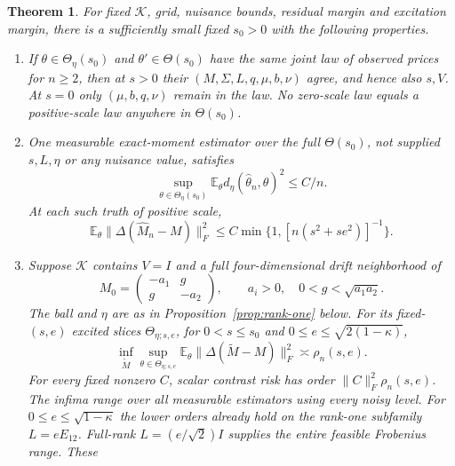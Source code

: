 \documentclass[11pt,a4paper]{amsart}
\theoremstyle{plain}
\newtheorem{theorem}{Theorem}[section]
\theoremstyle{definition}
\theoremstyle{remark}
\newcommand{\EE}{\mathbb{E}}
\begin{document}
\begin{theorem}\label{thm:main}
For fixed $\mathcal K$, grid, nuisance bounds, residual margin and
excitation margin, there is a sufficiently small fixed $s_0>0$ with the
following properties.
\begin{enumerate}[label=\textup{(\Alph*)},leftmargin=*]
\item\label{part:id} If $\theta\in\Theta_\eta(s_0)$ and
$\theta'\in\Theta(s_0)$ have the same joint law of observed prices for
$n\ge2$, then at $s>0$ their $(M,\Sigma,L,q,\mu,b,\nu)$ agree, and hence
also $s,V$. At $s=0$ only $(\mu,b,q,\nu)$ remain in the law. No zero-scale
law equals a positive-scale law anywhere in $\Theta(s_0)$.
\item\label{part:upper} One measurable exact-moment estimator over the
full $\Theta(s_0)$, not supplied $s,L,\eta$ or any nuisance value,
satisfies
\begin{equation}\label{eq:joint-risk}
 \sup_{\theta\in\Theta_\eta(s_0)}
 \EE_\theta d_\eta(\widehat\theta_n,\theta)^2\le C/n.
\end{equation}
At each such truth of positive scale,
\begin{equation}\label{eq:drift-upper}
 \EE_\theta\|\Delta(\widehat M_n-M)\|_F^2
 \le C\min\{1,[n(s^2+se^2)]^{-1}\}.
\end{equation}
\item\label{part:lower} Suppose $\mathcal K$ contains $V=I$ and a full
four-dimensional drift neighborhood of
\begin{equation}\label{eq:coupled}
 M_0=\begin{pmatrix}-a_1&g\\g&-a_2\end{pmatrix},\qquad
 a_i>0,\quad0<g<\sqrt{a_1a_2}.
\end{equation}
The ball and $\eta$ are as in Proposition~\ref{prop:rank-one} below.
For its fixed-$(s,e)$ excited slices $\Theta_{\eta;s,e}$, for
$0<s\le s_0$ and $0\le e\le\sqrt{2(1-\kappa)}$,
\begin{equation}\label{eq:minimax}
 \inf_{\widetilde M}\sup_{\theta\in\Theta_{\eta;s,e}}
 \EE_\theta\|\Delta(\widetilde M-M)\|_F^2\asymp\rho_n(s,e).
\end{equation}
For every fixed nonzero $C$, scalar contrast risk has order
$\|C\|_F^2\rho_n(s,e)$. The infima range over all measurable estimators
using every noisy level. For $0\le e\le\sqrt{1-\kappa}$ the lower orders already hold
on the rank-one subfamily $L=eE_{12}$. Full-rank
$L=(e/\sqrt2)I$ supplies the entire feasible Frobenius range. These

\end{enumerate}
\end{theorem}
\end{document}
